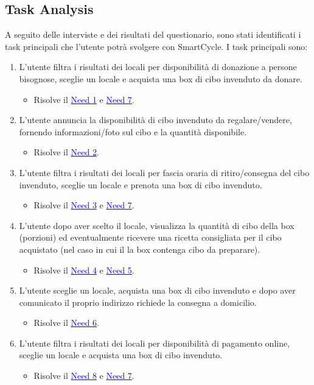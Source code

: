 \documentclass{article}
\begin{document}
\newpage
\subsection{Task Analysis}
A seguito delle interviste e dei risultati del questionario, sono stati identificati i task principali che l'utente potrà svolgere con SmartCycle.
\newline
I task principali sono:
\begin{enumerate}
    \item L'utente filtra i risultati dei locali per disponibilità di donazione a persone bisognose, sceglie un locale e acquista una box di cibo invenduto da donare.
    \begin{itemize}
        \item Risolve il \hyperref[need1]{\textcolor{blue}{Need 1}} e \hyperref[need7]{\textcolor{blue}{Need 7}}.
    \end{itemize}
    \item L'utente annuncia la disponibilità di cibo invenduto da regalare/vendere, fornendo informazioni/foto sul cibo e la quantità disponibile.
    \begin{itemize}
        \item Risolve il \hyperref[need2]{\textcolor{blue}{Need 2}}.
    \end{itemize}
    \item L'utente filtra i risultati dei locali per fascia oraria di ritiro/consegna del cibo invenduto, sceglie un locale e prenota una box di cibo invenduto.
    \begin{itemize}
        \item Risolve il \hyperref[need3]{\textcolor{blue}{Need 3}} e \hyperref[need7]{\textcolor{blue}{Need 7}}.
    \end{itemize}
    \item L'utente dopo aver scelto il locale, visualizza la quantità di cibo della box (porzioni) ed eventualmente ricevere una ricetta consigliata per il cibo acquistato (nel caso in cui il la box contenga cibo da preparare).
    \begin{itemize}
        \item Risolve il \hyperref[need4]{\textcolor{blue}{Need 4}} e \hyperref[need5]{\textcolor{blue}{Need 5}}.
    \end{itemize}
    \item L'utente sceglie un locale, acquista una box di cibo invenduto e dopo aver comunicato il proprio indirizzo richiede la consegna a domicilio.
    \begin{itemize}
        \item Risolve il \hyperref[need6]{\textcolor{blue}{Need 6}}.
    \end{itemize}
    \item L'utente filtra i risultati dei locali per disponibilità di pagamento online, sceglie un locale e acquista una box di cibo invenduto.
    \begin{itemize}
        \item Risolve il \hyperref[need8]{\textcolor{blue}{Need 8}} e \hyperref[need7]{\textcolor{blue}{Need 7}}.
    \end{itemize}
\end{enumerate}
\end{document}
